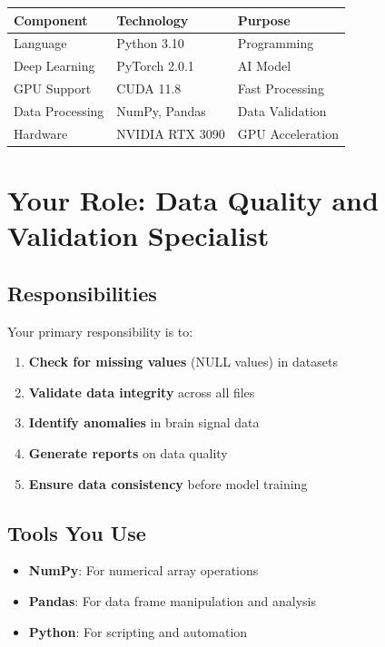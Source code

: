 \documentclass[12pt,a4paper]{article}
\begin{document}
\begin{table}[h]
\centering
\begin{tabular}{|l|l|l|}
\hline
\textbf{Component} & \textbf{Technology} & \textbf{Purpose} \\
\hline
Language & Python 3.10 & Programming \\
Deep Learning & PyTorch 2.0.1 & AI Model \\
GPU Support & CUDA 11.8 & Fast Processing \\
Data Processing & NumPy, Pandas & Data Validation \\
Hardware & NVIDIA RTX 3090 & GPU Acceleration \\
\hline
\end{tabular}
\end{table}

\section{Your Role: Data Quality and Validation Specialist}

\subsection{Responsibilities}

Your primary responsibility is to:

\begin{enumerate}
    \item \textbf{Check for missing values} (NULL values) in datasets
    \item \textbf{Validate data integrity} across all files
    \item \textbf{Identify anomalies} in brain signal data
    \item \textbf{Generate reports} on data quality
    \item \textbf{Ensure data consistency} before model training
\end{enumerate}

\subsection{Tools You Use}

\begin{tcolorbox}[colback=yellow!10,colframe=orange!50!black,title=Your Toolkit]
\begin{itemize}
    \item \textbf{NumPy}: For numerical array operations
    \item \textbf{Pandas}: For data frame manipulation and analysis
    \item \textbf{Python}: For scripting and automation
\end{itemize}
\end{tcolorbox}
\end{document}
